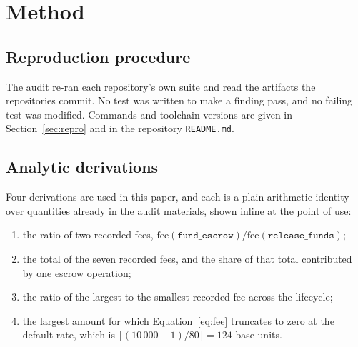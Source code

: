 \documentclass[sigconf,review]{acmart}
\begin{document}



\section{Method}
\label{sec:method}

\subsection{Reproduction procedure}

The audit re-ran each repository's own suite and read the artifacts the
repositories commit. No test was written to make a finding pass, and no failing
test was modified. Commands and toolchain versions are given in
Section~\ref{sec:repro} and in the repository \texttt{README.md}.

\subsection{Analytic derivations}

Four derivations are used in this paper, and each is a plain arithmetic
identity over quantities already in the audit materials, shown inline at the
point of use:
\begin{enumerate}
\item the ratio of two recorded fees, $\mathrm{fee}(\texttt{fund\_escrow}) /
      \mathrm{fee}(\texttt{release\_funds})$;
\item the total of the seven recorded fees, and the share of that total
      contributed by one escrow operation;
\item the ratio of the largest to the smallest recorded fee across the
      lifecycle;
\item the largest amount for which Equation~\ref{eq:fee} truncates to zero at
      the default rate, which is $\lfloor (10\,000-1) / 80 \rfloor = 124$ base
      units.
\end{enumerate}
\end{document}
